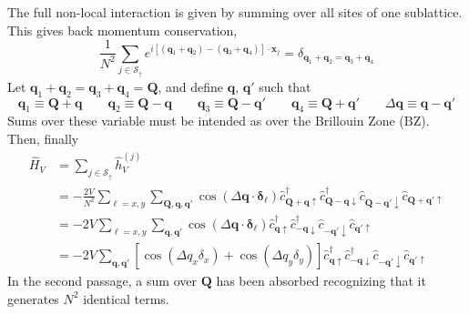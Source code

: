 The full non-local interaction is given by summing over all sites of one sublattice. This gives back momentum conservation,
\[
	\frac{1}{N^2} \sum_{j \in \mathcal{S}_\uparrow} e^{i \left[ (\mathbf{q}_1 + \mathbf{q}_2) - (\mathbf{q}_3 + \mathbf{q}_4) \right] \cdot \mathbf{x}_j} = \delta_{\mathbf{q}_1 + \mathbf{q}_2 = \mathbf{q}_3 + \mathbf{q}_4}
\]
Let $\mathbf{q}_1 + \mathbf{q}_2 = \mathbf{q}_3 + \mathbf{q}_4 = \mathbf{Q}$, and define $\mathbf{q}$, $\mathbf{q}'$ such that
\[
	\mathbf{q}_1 \equiv \mathbf{Q} + \mathbf{q} 
	\qquad
	\mathbf{q}_2 \equiv \mathbf{Q} - \mathbf{q} 
	\qquad
	\mathbf{q}_3 \equiv \mathbf{Q} - \mathbf{q}' 
	\qquad
	\mathbf{q}_4 \equiv \mathbf{Q} + \mathbf{q}'
	\qquad
	\Delta \mathbf{q} \equiv \mathbf{q}-\mathbf{q}'
\]
Sums over these variable must be intended as over the Brillouin Zone ($\mathrm{BZ}$). Then, finally
\[
\begin{aligned}
	\hat H_V &= \sum_{j \in \mathcal{S}_\uparrow} \hat h_V^{(j)} \\
	&= - \frac{2V}{N^2} \sum_{\ell = x,y} \sum_{\mathbf{Q}, \mathbf{q}, \mathbf{q}'} \cos\left(
		\Delta \mathbf{q} \cdot \bm{\delta}_\ell
	\right)	\hat c_{\mathbf{Q}+\mathbf{q} \uparrow}^\dagger \hat c_{\mathbf{Q}-\mathbf{q} \downarrow}^\dagger \hat c_{\mathbf{Q}-\mathbf{q}' \downarrow} \hat c_{\mathbf{Q}+\mathbf{q}'\uparrow} \\
	&= -2V \sum_{\ell = x,y} \sum_{\mathbf{q}, \mathbf{q}'} \cos\left(
	\Delta \mathbf{q} \cdot \bm{\delta}_\ell
	\right)	\hat c_{\mathbf{q} \uparrow}^\dagger \hat c_{-\mathbf{q} \downarrow}^\dagger \hat c_{-\mathbf{q}' \downarrow} \hat c_{\mathbf{q}'\uparrow} \\
	&= -2V \sum_{\mathbf{q}, \mathbf{q}'} 
	\left[
		\cos \left(
			\Delta q_x \delta_x
		\right)	+ \cos \left(
			\Delta q_y \delta_y
		\right)	
	\right]
	\hat c_{\mathbf{q} \uparrow}^\dagger \hat c_{-\mathbf{q} \downarrow}^\dagger \hat c_{-\mathbf{q}' \downarrow} \hat c_{\mathbf{q}'\uparrow}
\end{aligned}
\]
In the second passage, a sum over $\mathbf{Q}$ has been absorbed recognizing that it generates $N^2$ identical terms. \todo
